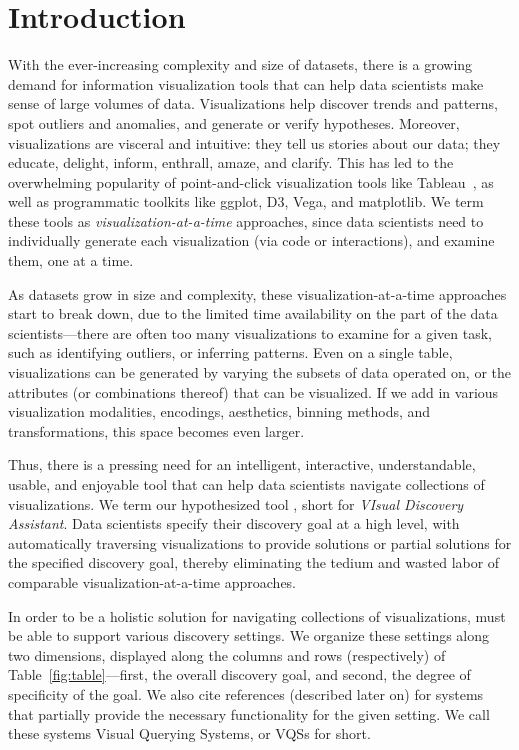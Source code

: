 \section{Introduction}%

\par 
With the ever-increasing complexity 
and size of datasets,
there is a growing demand for 
information visualization tools
that can help data scientists make sense of large
volumes of data.
Visualizations help discover 
trends and patterns, 
spot outliers and anomalies, 
and generate or verify hypotheses.
Moreover, 
visualizations are visceral and intuitive: 
they tell us stories about our data; 
they educate, delight, inform, 
enthrall, amaze, and clarify.
This has led to the overwhelming popularity
of point-and-click visualization tools like Tableau~\cite{Stolte2002},
as well as programmatic toolkits like ggplot, D3, Vega, and matplotlib. 
We term these tools as {\em visualization-at-a-time} approaches, since
data scientists need to individually 
generate each visualization (via code or interactions),
and examine them, 
one at a time.


\par
As datasets grow in size and complexity, 
these visualization-at-a-time approaches start to break down,
due to the limited time availability on the 
part of the data scientists---there 
are often too many visualizations to examine for a given 
task, such as identifying outliers, or inferring patterns. 
Even on a single table, 
visualizations can be generated
by varying the subsets of data operated on, 
or the attributes (or combinations
thereof) that can be visualized. 
If we add in various visualization modalities, encodings,
aesthetics, binning methods, and transformations,
this space becomes even larger.


\par
Thus, there is a pressing need for an 
intelligent,
interactive, understandable, usable, and
enjoyable tool that can help 
data scientists navigate
collections of visualizations.
We term our hypothesized tool \vida,
short for {\em VIsual Discovery Assistant}.
Data scientists specify their discovery
goal at a high level,
with \vida 
automatically 
traversing visualizations to provide
solutions or partial solutions for the
specified discovery goal, thereby
eliminating the tedium and wasted
labor of comparable visualization-at-a-time 
approaches.

\par
{} In order to be a holistic solution for 
navigating collections of visualizations,
\vida must be able to support various discovery
settings. 
We organize these settings along two
dimensions, displayed along the columns and 
rows (respectively) of Table~\ref{fig:table}---first, the overall discovery goal,
and second, the degree of specificity of the goal.
We also cite references (described later on)
for systems that partially provide the necessary
functionality for the given setting.
We call these systems Visual Querying Systems, or VQSs for short.


